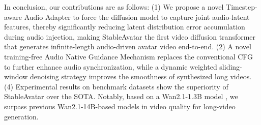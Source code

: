 In conclusion, our contributions are as follows:
(1) We propose a novel Timestep-aware Audio Adapter to force the diffusion model to capture joint audio-latent features, thereby significantly reducing latent distribution error accumulation during audio injection, making StableAvatar the first video diffusion transformer that generates infinite-length audio-driven avatar video end-to-end.
(2) A novel training-free Audio Native Guidance Mechanism replaces the conventional CFG to further enhance audio synchronization, while a dynamic weighted sliding-window denoising strategy improves the smoothness of synthesized long videos.
(4) Experimental results on benchmark datasets show the superiority of StableAvatar over the SOTA. Notably, based on a Wan2.1-1.3B model \cite{wan2025}, we surpass previous Wan2.1-14B-based models in video quality for long-video generation.
